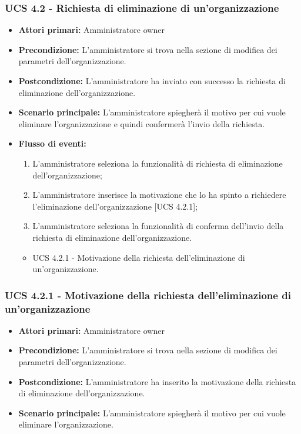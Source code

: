 \subsubsection{UCS 4.2 - Richiesta di eliminazione di un'organizzazione}%
\begin{itemize}
\item \textbf{Attori primari:} Amministratore owner
\item \textbf{Precondizione:} L'amministratore si trova nella sezione di modifica dei parametri dell'organizzazione.
\item \textbf{Postcondizione:} L'amministratore ha inviato con successo la richiesta di eliminazione dell'organizzazione.
\item \textbf{Scenario principale:} L'amministratore spiegherà il motivo per cui vuole eliminare l'organizzazione e quindi confermerà l'invio della richiesta.
\item \textbf{Flusso di eventi:}
\begin{enumerate}
    \item L'amministratore seleziona la funzionalità di richiesta di eliminazione dell'organizzazione;
    \item L'amministratore inserisce la motivazione che lo ha spinto a richiedere l'eliminazione dell'organizzazione [UCS 4.2.1];
    \item L'amministratore seleziona la funzionalità di conferma dell'invio della richiesta di eliminazione dell'organizzazione.
\end{enumerate}
\begin{itemize}
    \item UCS 4.2.1 - Motivazione della richiesta dell'eliminazione di un'organizzazione.
\end{itemize}
\end{itemize}

\subsubsection{UCS 4.2.1 - Motivazione della richiesta dell'eliminazione di un'organizzazione}%
\begin{itemize}
\item \textbf{Attori primari:} Amministratore owner
\item \textbf{Precondizione:} L'amministratore si trova nella sezione di modifica dei parametri dell'organizzazione.
\item \textbf{Postcondizione:} L'amministratore ha inserito la motivazione della richiesta di eliminazione dell'organizzazione.
\item \textbf{Scenario principale:} L'amministratore spiegherà il motivo per cui vuole eliminare l'organizzazione.
\end{itemize}

